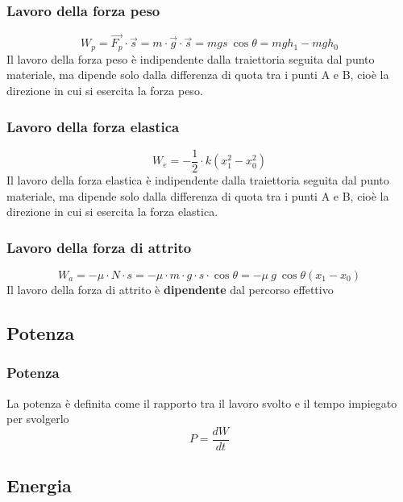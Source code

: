 \documentclass[twoside]{article}
\begin{document}
\subsubsection{Lavoro della forza peso}
\begin{equation}
  \boxed{W_p = \vec{F_p} \cdot \vec{s} = m \cdot \vec{g} \cdot \vec{s} = mgs \ \cos{\theta} = mgh_1 - mgh_0}
\end{equation}
Il lavoro della forza peso è indipendente dalla traiettoria seguita dal punto materiale, ma dipende solo dalla differenza di quota tra i punti A e B, cioè la direzione in cui si esercita la forza peso.

\subsubsection{Lavoro della forza elastica}
\begin{equation}
  \boxed{W_e = -\frac{1}{2} \cdot k(x_1^2 - x_0^2)}
\end{equation}
Il lavoro della forza elastica è indipendente dalla traiettoria seguita dal punto materiale, ma dipende solo dalla differenza di quota tra i punti A e B, cioè la direzione in cui si esercita la forza elastica.

\subsubsection{Lavoro della forza di attrito}
\begin{equation}
  \boxed{W_a = -\mu \cdot N \cdot s = -\mu \cdot m \cdot g \cdot s \cdot \cos{\theta} = -\mu\ g\ \cos{\theta} ( x_1 - x_0)}
\end{equation}
Il lavoro della forza di attrito è \textbf{dipendente} dal percorso effettivo

\subsection{Potenza}
\subsubsection{Potenza}
La potenza è definita come il rapporto tra il lavoro svolto e il tempo impiegato per svolgerlo
\begin{equation}
  \boxed{P = \frac{dW}{dt}}
\end{equation}


\subsection{Energia}
\end{document}
